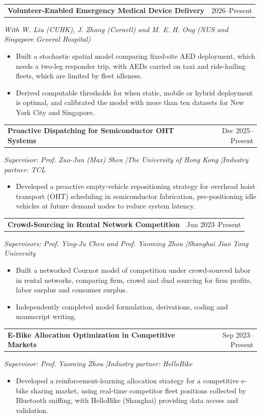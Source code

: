 \documentclass[11pt,letterpaper]{article}
\makeatletter
\newcommand{\entry}[3]{%
  \Needspace{4\baselineskip}%
  \begin{tabularx}{\linewidth}{@{}Xr@{}}
    \textbf{#1} & {\small #2}
  \end{tabularx}\par
  {\small\itshape #3\par}
}
\makeatother
\begin{document}
\entry{Volunteer-Enabled Emergency Medical Device Delivery}{2026--Present}
  {With W. Liu (CUHK), J. Zhang (Cornell) and M. E. H. Ong (NUS and Singapore General Hospital)}
\begin{itemize}
  \item Built a stochastic spatial model comparing fixed-site AED deployment, which needs a two-leg responder trip, with AEDs carried on taxi and ride-hailing fleets, which are limited by fleet idleness.
  \item Derived computable thresholds for when static, mobile or hybrid deployment is optimal, and calibrated the model with more than ten datasets for New York City and Singapore.
\end{itemize}
\vspace{2pt}

\entry{Proactive Dispatching for Semiconductor OHT Systems}{Dec 2025--Present}
  {Supervisor: Prof. Zuo-Jun (Max) Shen \enspace|\enspace The University of Hong Kong \enspace|\enspace Industry partner: TCL}
\begin{itemize}
  \item Developed a proactive empty-vehicle repositioning strategy for overhead hoist transport (OHT) scheduling in semiconductor fabrication, pre-positioning idle vehicles at future demand nodes to reduce system latency.
\end{itemize}
\vspace{2pt}

\entry{Crowd-Sourcing in Rental Network Competition}{Jun 2023--Present}
  {Supervisors: Prof. Ying-Ju Chen and Prof. Yaoming Zhou \enspace|\enspace Shanghai Jiao Tong University}
\begin{itemize}
  \item Built a networked Cournot model of competition under crowd-sourced labor in rental networks, comparing firm, crowd and dual sourcing for firm profits, labor surplus and consumer surplus.
  \item Independently completed model formulation, derivations, coding and manuscript writing.
\end{itemize}
\vspace{2pt}

\entry{E-Bike Allocation Optimization in Competitive Markets}{Sep 2023--Present}
  {Supervisor: Prof. Yaoming Zhou \enspace|\enspace Industry partner: HelloBike}
\begin{itemize}
  \item Developed a reinforcement-learning allocation strategy for a competitive e-bike sharing market, using real-time competitor fleet positions collected by Bluetooth sniffing, with HelloBike (Shanghai) providing data access and validation.
\end{itemize}
\vspace{2pt}
\end{document}
